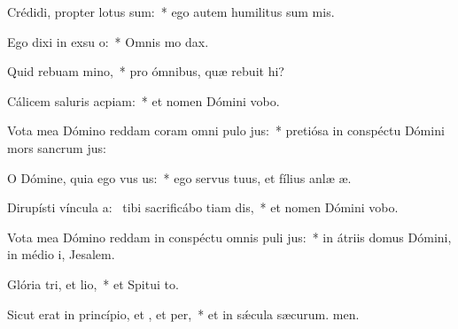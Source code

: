 \item Crédidi, propter  lotus sum:~* ego autem humilitus sum mis.
\item Ego dixi in exsu o:~* Omnis mo dax.
\item Quid rebuam mino,~* pro ómnibus, quæ rebuit hi?
\item Cálicem saluris acpiam:~* et nomen Dómini vobo.
\item Vota mea Dómino reddam coram omni pulo jus:~* pretiósa in conspéctu Dómini mors sancrum jus:
\item O Dómine, quia ego vus us:~* ego servus tuus, et fílius anlæ æ.
\item Dirupísti víncula a:~\pscross{} tibi sacrificábo tiam dis,~* et nomen Dómini vobo.
\item Vota mea Dómino reddam in conspéctu omnis puli jus:~* in átriis domus Dómini, in médio i, Jesalem.
\item Glória tri, et lio,~* et Spitui to.
\item Sicut erat in princípio, et , et per,~* et in sǽcula sæcurum. men.
